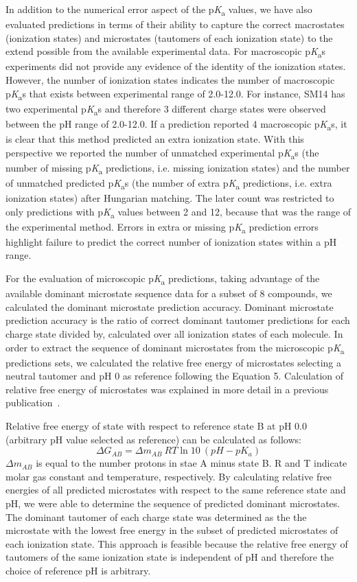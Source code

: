 \documentclass[9pt,lineno,final]{elife}
\newcommand{\pKa}{p\textit{K}\textsubscript{a}}
\begin{document}
In addition to the numerical error aspect of the \pKa{} values, we have also evaluated predictions in terms of their ability to capture the correct macrostates (ionization states) and microstates (tautomers of each ionization state) to the extend possible from the available experimental data. 
For macroscopic \pKa{}s experiments did not provide any evidence of the identity of the ionization states. 
However, the number of ionization states indicates the number of macroscopic \pKa{}s that exists between experimental range of 2.0-12.0. 
For instance, SM14 has two experimental \pKa{}s and therefore 3 different charge states were observed between the pH range of 2.0-12.0. 
If a prediction reported 4 macroscopic \pKa{}s, it is clear that this method predicted an extra ionization state. 
With this perspective we reported the number of unmatched experimental \pKa{}s (the number of missing \pKa{} predictions, i.e. missing ionization states) and the number of unmatched predicted \pKa{}s (the number of extra \pKa{} predictions, i.e. extra ionization states) after Hungarian matching. 
The later count was restricted to only predictions with \pKa{} values between 2 and 12, because that was the range of the experimental method. 
Errors in extra or missing \pKa{} prediction errors highlight failure to predict the correct number of ionization states within a pH range.

For the evaluation of microscopic \pKa{} predictions, taking advantage of the available dominant microstate sequence data for a subset of 8 compounds, we calculated the dominant microstate prediction accuracy. Dominant microstate prediction accuracy is the ratio of correct dominant tautomer predictions for each charge state divided by, calculated over all ionization states of each molecule. 
In order to extract the sequence of dominant microstates from the microscopic \pKa{} predictions sets, we calculated the relative free energy of microstates selecting a neutral tautomer and pH 0 as reference following the Equation 5. Calculation of relative free energy of microstates was explained in more detail in a previous publication~\citep{Gunner:2020:J.Comput.AidedMol.Des.}. 

Relative free energy of state with respect to reference state B at pH 0.0 (arbitrary pH value selected as reference) can be calculated as follows: 
\begin{equation}
\Delta G_{AB} = \Delta m_{AB} \:RT\ln{10}\:(pH - pK_{a})
\end{equation}
$\Delta m_{AB}$ is equal to the number protons in stae A minus state B. R and T indicate molar gas constant and temperature, respectively. 
By calculating relative free energies of all predicted microstates with respect to the same reference state and pH, we were able to determine the sequence of predicted dominant microstates. 
The dominant tautomer of each charge state was determined as the the microstate with the lowest free energy in the subset of predicted microstates of each ionization state. 
This approach is feasible because the relative free energy of tautomers of the same ionization state is independent of pH and therefore the choice of reference pH is arbitrary.
\end{document}
